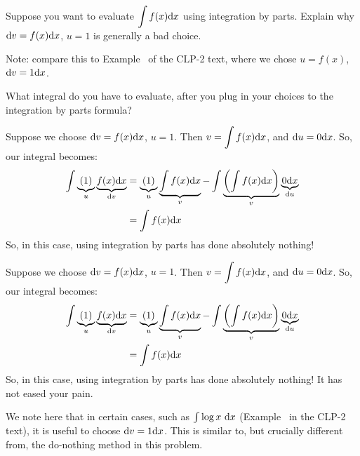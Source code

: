 \begin{question}\label{1.7_badchoices}
Suppose you want to evaluate $\displaystyle\int f(x)\mathrm{d}x$ using integration by parts. Explain why $\mathrm{d}v = f(x)\mathrm{d}x$, $u=1$ is generally a bad choice.

Note: compare this to Example~ of the CLP-2 text, where we chose $u=f(x)$, $\mathrm{d}v=1\mathrm{d}x$.
\end{question}
\begin{hint}
What integral do you have to evaluate, after you plug in your choices to the integration by parts formula?
\end{hint}
\begin{answer}
Suppose we choose $\mathrm{d}v = f(x)\mathrm{d}x$, $u=1$. Then $v = \displaystyle\int f(x)\mathrm{d}x$, and $\mathrm{d}u=0\mathrm{d}x$. So, our integral becomes:
\begin{align*}
\int \underbrace{(1)}_{u}\underbrace{f(x)\mathrm{d}x}_{\mathrm{d}v}&=
\underbrace{(1)}_{u}\underbrace{\int f(x)\mathrm{d}x}_{v} - \int\underbrace{ \left(\int f(x)\mathrm{d}x\right)}_{v}\underbrace{0\mathrm{d}x}_{\mathrm{d}u} \\
&=\int f(x)\mathrm{d}x
\end{align*}
So, in this case, using integration by parts has done absolutely nothing! 
\end{answer}
\begin{solution}
Suppose we choose $\mathrm{d}v = f(x)\mathrm{d}x$, $u=1$. Then $v = \displaystyle\int f(x)\mathrm{d}x$, and $\mathrm{d}u=0\mathrm{d}x$. So, our integral becomes:
\begin{align*}
\int \underbrace{(1)}_{u}\underbrace{f(x)\mathrm{d}x}_{\mathrm{d}v}&=
\underbrace{(1)}_{u}\underbrace{\int f(x)\mathrm{d}x}_{v} - \int\underbrace{ \left(\int f(x)\mathrm{d}x\right)}_{v}\underbrace{0\mathrm{d}x}_{\mathrm{d}u} \\
&=\int f(x)\mathrm{d}x
\end{align*}
So, in this case, using integration by parts has done absolutely nothing! It has not eased your pain.

We note here that in certain cases, such as $\int\log x~ \mathrm{d}x$ (Example~  in the CLP-2 text), it is useful to choose $\mathrm{d}v=1\mathrm{d}x$. This is similar to, but crucially different from, the do-nothing method in this problem.
\end{solution}



\subsection*{\Procedural}


